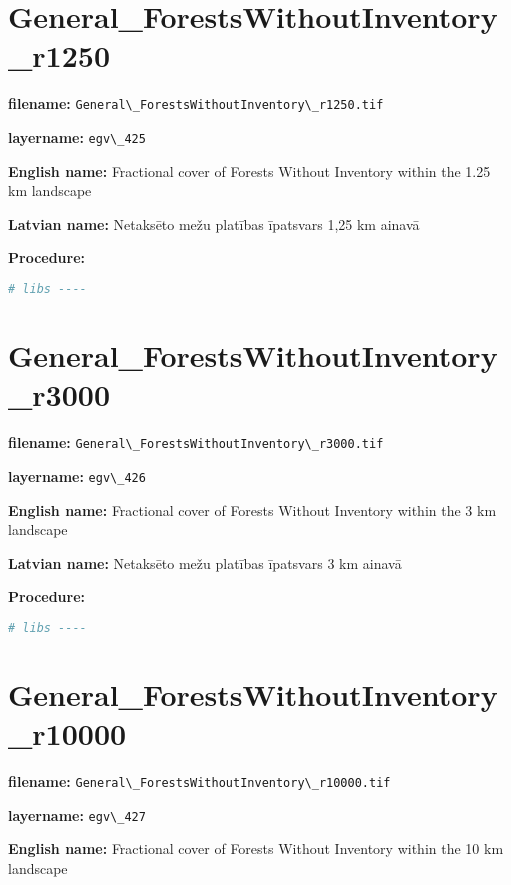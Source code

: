 \documentclass[
]{book}
\newcommand{\passthrough}[1]{#1}
\begin{document}
\section{General\_ForestsWithoutInventory\_r1250}\label{ch06.425}

\textbf{filename:} \passthrough{\lstinline!General\_ForestsWithoutInventory\_r1250.tif!}

\textbf{layername:} \passthrough{\lstinline!egv\_425!}

\textbf{English name:} Fractional cover of Forests Without Inventory within the 1.25 km landscape

\textbf{Latvian name:} Netaksēto mežu platības īpatsvars 1,25 km ainavā

\textbf{Procedure:}

\begin{lstlisting}[language=R]
# libs ----
\end{lstlisting}

\section{General\_ForestsWithoutInventory\_r3000}\label{ch06.426}

\textbf{filename:} \passthrough{\lstinline!General\_ForestsWithoutInventory\_r3000.tif!}

\textbf{layername:} \passthrough{\lstinline!egv\_426!}

\textbf{English name:} Fractional cover of Forests Without Inventory within the 3 km landscape

\textbf{Latvian name:} Netaksēto mežu platības īpatsvars 3 km ainavā

\textbf{Procedure:}

\begin{lstlisting}[language=R]
# libs ----
\end{lstlisting}

\section{General\_ForestsWithoutInventory\_r10000}\label{ch06.427}

\textbf{filename:} \passthrough{\lstinline!General\_ForestsWithoutInventory\_r10000.tif!}

\textbf{layername:} \passthrough{\lstinline!egv\_427!}

\textbf{English name:} Fractional cover of Forests Without Inventory within the 10 km landscape
\end{document}
